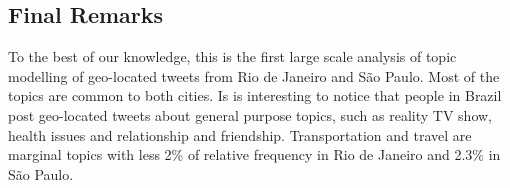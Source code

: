 
\subsection{Final Remarks}
To the best of our knowledge, this is the first large scale analysis of topic modelling of geo-located tweets from Rio de Janeiro and São Paulo. Most of the topics are common to both cities. Is is interesting to notice that people in Brazil post geo-located tweets about general purpose topics, such as reality TV show, health issues and relationship and friendship. Transportation and travel are marginal topics with less 2\% of relative frequency in Rio de Janeiro and 2.3\% in São Paulo.



